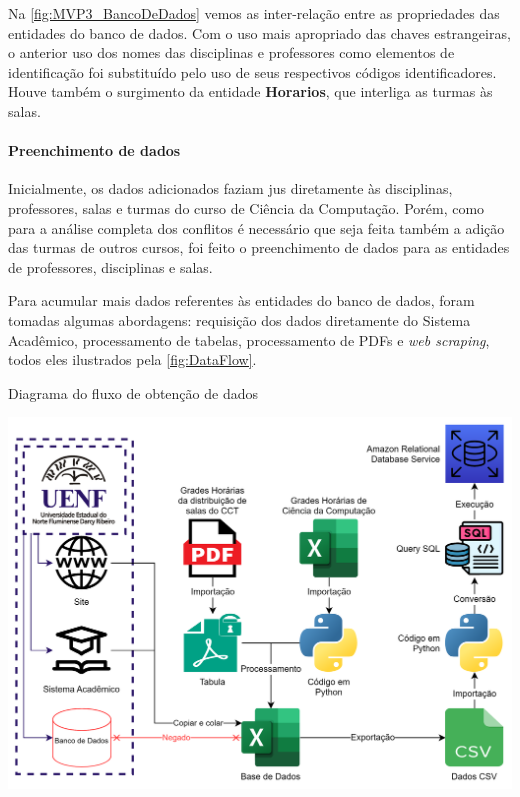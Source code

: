 Na \autoref{fig:MVP3_BancoDeDados} vemos as inter-relação entre as propriedades das entidades do banco de dados. Com o uso mais apropriado das chaves estrangeiras, o anterior uso dos nomes das disciplinas e professores como elementos de identificação foi substituído pelo uso de seus respectivos códigos identificadores. Houve também o surgimento da entidade \textbf{Horarios}, que interliga as turmas às salas.

\paragraph*{Preenchimento de dados} \label{par:preenchimento}

Inicialmente, os dados adicionados faziam jus diretamente às disciplinas, professores, salas e turmas do curso de Ciência da Computação. Porém, como para a análise completa dos conflitos é necessário que seja feita também a adição das turmas de outros cursos, foi feito o preenchimento de dados para as entidades de professores, disciplinas e salas.

Para acumular mais dados referentes às entidades do banco de dados, foram tomadas algumas abordagens: requisição dos dados diretamente do Sistema Acadêmico, processamento de tabelas, processamento de PDFs e \textit{web scraping}, todos eles ilustrados pela \autoref{fig:DataFlow}.

\begin{MyCenteredFigure} \caption{Diagrama do fluxo de obtenção de dados} \label{fig:DataFlow}
  \includegraphics[width=\textwidth]{files/img/2.02!5-desenvolvimento/2.02!5.1.4-sistema/Processamento de dados.drawio}
\end{MyCenteredFigure}

